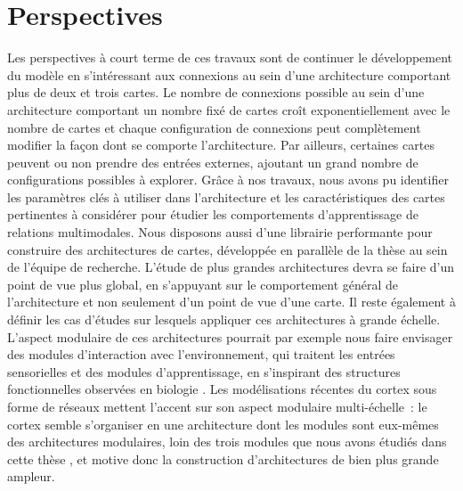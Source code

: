 \section*{Perspectives}

Les perspectives à court terme de ces travaux sont de continuer le développement du modèle en s'intéressant aux connexions au sein d'une architecture comportant plus de deux et trois cartes.
Le nombre de connexions possible au sein d'une architecture comportant un nombre fixé de cartes croît exponentiellement avec le nombre de cartes et chaque configuration de connexions peut complètement modifier la façon dont se comporte l'architecture. Par ailleurs, certaines cartes peuvent ou non prendre des entrées externes, ajoutant un grand nombre de configurations possibles à explorer.
Grâce à nos travaux, nous avons pu identifier les paramètres clés à utiliser dans l'architecture et les caractéristiques des cartes pertinentes à considérer pour étudier les comportements d'apprentissage de relations multimodales. Nous disposons aussi d'une librairie performante pour construire des architectures de cartes, développée en parallèle de la thèse au sein de l'équipe de recherche.
L'étude de plus grandes architectures devra se faire d'un point de vue plus global, en s'appuyant sur le comportement général de l'architecture et non seulement d'un point de vue d'une carte. Il reste également à définir les cas d'études sur lesquels appliquer ces architectures à grande échelle.
L'aspect modulaire de ces architectures pourrait par exemple nous faire envisager des modules d'interaction avec l'environnement, qui traitent les entrées sensorielles et des modules d'apprentissage, en s'inspirant des structures fonctionnelles observées en biologie \cite{Ellefsen2015NeuralMH}. 
Les modélisations récentes du cortex sous forme de réseaux mettent l'accent sur son aspect modulaire multi-échelle~: le cortex semble s'organiser en une architecture dont les modules sont eux-mêmes des architectures modulaires, loin des trois modules que nous avons étudiés dans cette thèse \cite{betzel_multi-scale_2017}, et motive donc la construction d'architectures de bien plus grande ampleur.

